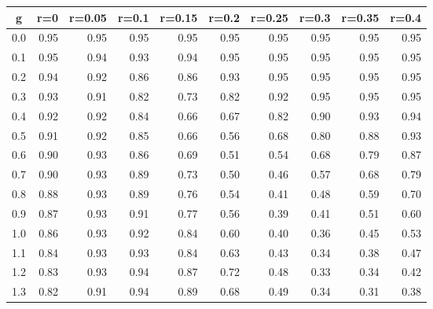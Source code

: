 %
\begin{table}[!tbp]
 \begin{center}
 \begin{tabular}{rrrrrrrrrr}\hline\hline
\multicolumn{1}{c}{g}&\multicolumn{1}{c}{r=0}&\multicolumn{1}{c}{r=0.05}&\multicolumn{1}{c}{r=0.1}&\multicolumn{1}{c}{r=0.15}&\multicolumn{1}{c}{r=0.2}&\multicolumn{1}{c}{r=0.25}&\multicolumn{1}{c}{r=0.3}&\multicolumn{1}{c}{r=0.35}&\multicolumn{1}{c}{r=0.4}\tabularnewline
\hline
0.0&0.95&0.95&0.95&0.95&0.95&0.95&0.95&0.95&0.95\tabularnewline
0.1&0.95&0.94&0.93&0.94&0.95&0.95&0.95&0.95&0.95\tabularnewline
0.2&0.94&0.92&0.86&0.86&0.93&0.95&0.95&0.95&0.95\tabularnewline
0.3&0.93&0.91&0.82&0.73&0.82&0.92&0.95&0.95&0.95\tabularnewline
0.4&0.92&0.92&0.84&0.66&0.67&0.82&0.90&0.93&0.94\tabularnewline
0.5&0.91&0.92&0.85&0.66&0.56&0.68&0.80&0.88&0.93\tabularnewline
0.6&0.90&0.93&0.86&0.69&0.51&0.54&0.68&0.79&0.87\tabularnewline
0.7&0.90&0.93&0.89&0.73&0.50&0.46&0.57&0.68&0.79\tabularnewline
0.8&0.88&0.93&0.89&0.76&0.54&0.41&0.48&0.59&0.70\tabularnewline
0.9&0.87&0.93&0.91&0.77&0.56&0.39&0.41&0.51&0.60\tabularnewline
1.0&0.86&0.93&0.92&0.84&0.60&0.40&0.36&0.45&0.53\tabularnewline
1.1&0.84&0.93&0.93&0.84&0.63&0.43&0.34&0.38&0.47\tabularnewline
1.2&0.83&0.93&0.94&0.87&0.72&0.48&0.33&0.34&0.42\tabularnewline
1.3&0.82&0.91&0.94&0.89&0.68&0.49&0.34&0.31&0.38\tabularnewline
\hline
\end{tabular}

\end{center}

\end{table}

